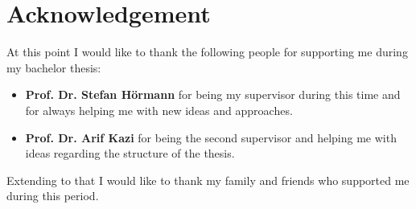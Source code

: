 \chapter*{Acknowledgement}
\label{acknowledgement}
At this point I would like to thank the following people for supporting me during my bachelor thesis:

\begin{itemize}
\item \textbf{Prof. Dr. Stefan Hörmann} for being my supervisor during this time and for always helping me with new ideas and approaches.
\item \textbf{Prof. Dr. Arif Kazi} for being the second supervisor and helping me with ideas regarding the structure of the thesis.
\end{itemize}

Extending to that I would like to thank my family and friends who supported me during this period.

